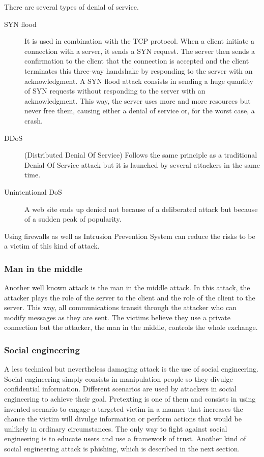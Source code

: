 There are several
types of denial of service.
\begin{description}
\item[SYN flood]
It is used in combination with the TCP protocol. When a client
initiate a connection with a server, it sends a SYN request. The server then
sends a confirmation to the client that the connection is accepted and the
client terminates this three-way handshake by responding to the server with an
acknowledgment. A SYN flood attack consists in sending a huge quantity of SYN
requests without responding to the server with an acknowledgment. This way, the
server uses more and more resources but never free them, causing either a denial
of service or, for the worst case, a crash.
\item[DDoS] (Distributed Denial Of Service)
Follows the same principle as a traditional Denial Of Service attack but it is
launched by several attackers in the same time.
\item[Unintentional DoS]
A web site ends up denied not because of a deliberated attack but because of a
sudden peak of popularity.
\end{description}
Using firewalls as well as Intrusion Prevention System can reduce the risks to
be a victim of this kind of attack.

\subsubsection{Man in the middle}
Another well known attack is the man in the middle attack. In this attack, the
attacker plays the role of the server to the client and the role of the client
to the server. This way, all communications transit through the attacker who can
modify messages as they are sent. The victims believe they use a private
connection but the attacker, the man in the middle, controls the whole exchange.

\subsubsection{Social engineering}
A less technical but nevertheless damaging attack is the use of social
engineering. Social engineering simply consists in manipulation people so they
divulge confidential information. Different scenarios are used by attackers in
social engineering to achieve their goal. Pretexting is one of them and consists
in using invented scenario to engage a targeted victim in a manner that
increases the chance the victim will divulge information or perform actions
that would be unlikely in ordinary circumstances. The only way to fight against
social engineering is to educate users and use a framework of trust. Another
kind of social engineering attack is phishing, which is described in the next
section.

